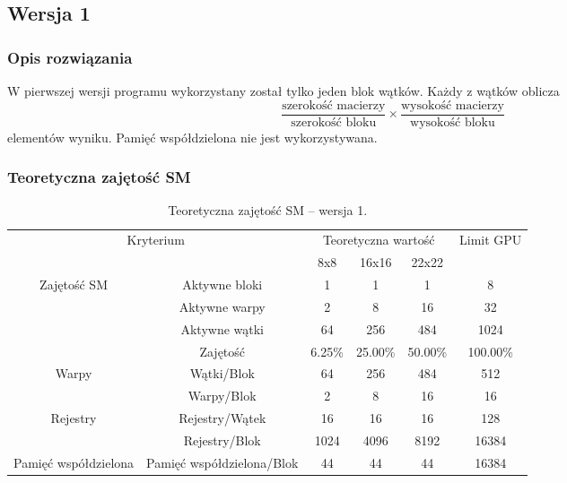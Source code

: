\newpage
\subsection{Wersja 1}

\subsubsection{Opis rozwiązania}

W pierwszej wersji programu wykorzystany został tylko jeden blok wątków. Każdy z wątków oblicza\footnotemark $$\frac{\text{szerokość macierzy}}{\text{szerokość bloku}} \times \frac{\text{wysokość macierzy}}{\text{wysokość bloku}}$$ elementów wyniku. Pamięć współdzielona nie jest wykorzystywana.



\newpage
\subsubsection{Teoretyczna zajętość SM}

\begin{center}
\begin{table}[H]
\centering
\begin{tabular}{|c|c|c|c|c|c|}
\hline
\multicolumn{2}{|c|}{\multirow{2}{*}{Kryterium}} & \multicolumn{3}{c|}{Teoretyczna wartość} & \multirow{2}{*}{Limit GPU} \\ \cline{3-5}
\multicolumn{2}{|c|}{} & 8x8 & 16x16 & 22x22 & \\ \hline
\multirow{4}{*}{Zajętość SM} & Aktywne bloki & 1 & 1 & 1 & 8 \\ \cline{2-6}
& Aktywne warpy & 2 & 8 & 16 & 32 \\ \cline{2-6}
& Aktywne wątki & 64 & 256 & 484 & 1024 \\ \cline{2-6}
& Zajętość & 6.25\% & 25.00\% & 50.00\% & 100.00\% \\ \hline
\multirow{2}{*}{Warpy} & Wątki/Blok & 64 & 256 & 484 & 512 \\ \cline{2-6}
& Warpy/Blok & 2 & 8 & 16 & 16 \\ \hline
\multirow{2}{*}{Rejestry} & Rejestry/Wątek & 16 & 16 & 16 & 128 \\ \cline{2-6}
& Rejestry/Blok & 1024 & 4096 & 8192 & 16384 \\ \hline
\multirow{1}{*}{Pamięć współdzielona} & Pamięć współdzielona/Blok & 44 & 44 & 44 & 16384 \\ \hline
\end{tabular}
\caption{Teoretyczna zajętość SM -- wersja 1.}
\end{table}
\end{center}

